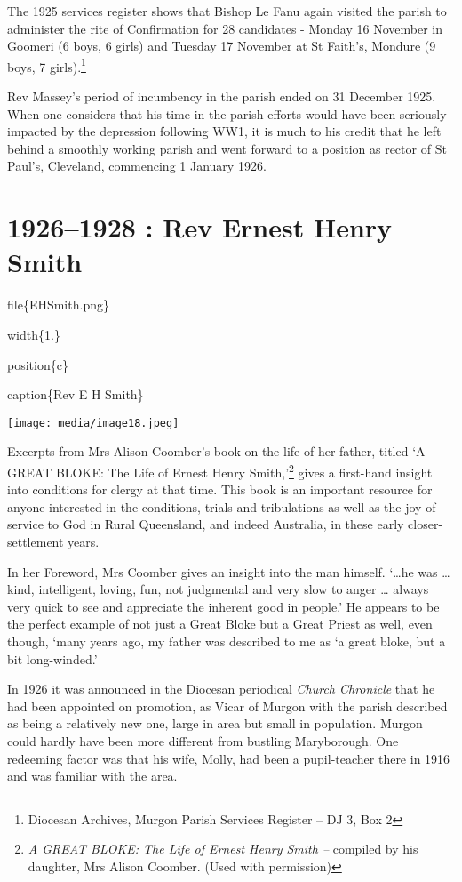 The 1925 services register shows that Bishop Le Fanu again visited the parish to administer the rite of Confirmation for 28 candidates - Monday 16 November in Goomeri (6 boys, 6 girls) and Tuesday 17 November at St Faith's, Mondure (9 boys, 7 girls).\footnote{Diocesan Archives, Murgon Parish Services Register -- DJ 3, Box 2}

Rev Massey's period of incumbency in the parish ended on 31 December 1925. When one considers that his time in the parish efforts would have been seriously impacted by the depression following WW1, it is much to his credit that he left behind a smoothly working parish and went forward to a position as rector of St Paul's, Cleveland, commencing 1 January 1926.

\hypertarget{rev-ernest-henry-smith}{%
\chapter{1926--1928 : Rev Ernest Henry Smith}\label{rev-ernest-henry-smith}}

file\{EHSmith.png\}

width\{1.\}

position\{c\}

caption\{Rev E H Smith\}

\texttt{[image: media/image18.jpeg]}

Excerpts from Mrs Alison Coomber's book on the life of her father, titled `A GREAT BLOKE: The Life of Ernest Henry Smith,'\footnote{\emph{A GREAT BLOKE: The Life of Ernest Henry Smith --} compiled by his daughter, Mrs Alison Coomber. (Used with permission)} gives a first-hand insight into conditions for clergy at that time. This book is an important resource for anyone interested in the conditions, trials and tribulations as well as the joy of service to God in Rural Queensland, and indeed Australia, in these early closer-settlement years.

In her Foreword, Mrs Coomber gives an insight into the man himself. `\ldots he was \ldots{} kind, intelligent, loving, fun, not judgmental and very slow to anger \ldots{} always very quick to see and appreciate the inherent good in people.' He appears to be the perfect example of not just a Great Bloke but a Great Priest as well, even though, `many years ago, my father was described to me as `a great bloke, but a bit long-winded.'

In 1926 it was announced in the Diocesan periodical \emph{Church Chronicle} that he had been appointed on promotion, as Vicar of Murgon with the parish described as being a relatively new one, large in area but small in population. Murgon could hardly have been more different from bustling Maryborough. One redeeming factor was that his wife, Molly, had been a pupil-teacher there in 1916 and was familiar with the area.

